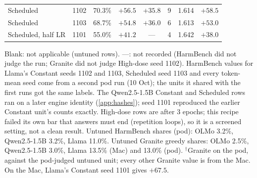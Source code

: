 \documentclass[11pt]{article}
\begin{document}
\begin{table}[t]
\begin{tabular}{@{}l c c c c c c c@{}}
    Scheduled & 1102 & 70.3\% & $+56.5$ & $+35.8$ & 9 & 1.614 & $+58.5$ \\
    Scheduled & 1103 & 68.7\% & $+54.8$ & $+36.0$ & 6 & 1.613 & $+53.0$ \\
    Scheduled, half LR & 1101 & 55.0\% & $+41.2$ & --- & 4 & 1.642 & $+38.0$ \\
    \bottomrule
  \end{tabular}

  \smallskip
  \parbox{\textwidth}{\footnotesize\raggedright
    Blank: not applicable (untuned rows). ---: not recorded (HarmBench did not
    judge the run; Granite did not judge High-dose seed 1102). HarmBench
    values for Llama's Constant seeds 1102 and 1103, Scheduled seed 1103 and
    every token-mean seed come from a second pod run (10 Oct); the units it
    shared with the first runs got the same labels. The Qwen2.5-1.5B Constant
    and Scheduled rows ran on a later engine identity (\cref{app:hashes});
    seed 1101 reproduced the earlier Constant unit's counts exactly. High-dose
    rows are after 3 epochs; this recipe failed its own bar that answers must
    end (repetition loops), so it is a screened setting, not a clean result.
    Untuned HarmBench shares (pod): OLMo 3.2\%, Qwen2.5-1.5B 3.2\%, Llama
    11.0\%. Untuned Granite greedy shares: OLMo 2.5\%, Qwen2.5-1.5B 3.0\%,
    Llama 13.5\% (Mac) and 13.0\% (pod). $^{\dagger}$Granite on the pod,
    against the pod-judged untuned unit; every other Granite value is from the
    Mac. On the Mac, Llama's Constant seed 1101 gives $+67.5$.}
\end{table}
\end{document}
